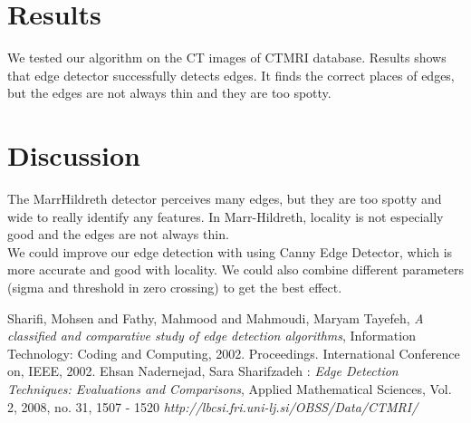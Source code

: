 \documentclass[a4paper,10pt]{article}
\begin{document}
\section{Results}
We tested our algorithm on the CT images of CTMRI database. Results shows that edge detector successfully detects edges. It finds the correct places of edges, but the edges are not always thin and they are too spotty.
\section{Discussion}
The MarrHildreth detector perceives many edges, but they are too spotty and wide to really
identify any features. In Marr-Hildreth, locality is not especially good and the edges are not always thin. \\
We could improve our edge detection with using Canny Edge Detector, which is more accurate and good with locality.
We could also combine different parameters (sigma and threshold in zero crossing) to get the best effect.
\begin{thebibliography}{9}

 Sharifi, Mohsen and Fathy, Mahmood and Mahmoudi, Maryam Tayefeh,
  \emph{A classified and comparative study of edge detection algorithms},
  Information Technology: Coding and Computing, 2002. Proceedings. International Conference on, IEEE,
  2002.
 Ehsan Nadernejad, Sara Sharifzadeh : 
  \emph{Edge Detection Techniques: Evaluations and Comparisons},
  Applied Mathematical Sciences, Vol. 2, 2008, no. 31, 1507 - 1520 
  \emph{http://lbcsi.fri.uni-lj.si/OBSS/Data/CTMRI/}


\end{thebibliography}
\end{document}
